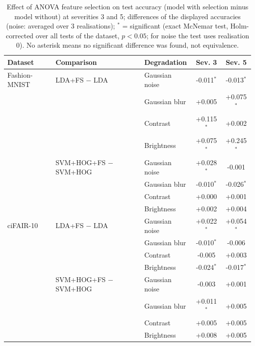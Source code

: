 \begin{table}[t]
\centering
\caption{Effect of ANOVA feature selection on test accuracy (model with selection minus model without) at severities 3 and 5; differences of the displayed accuracies (noise: averaged over 3 realisations); $^{*}$ = significant (exact McNemar test, Holm-corrected over all tests of the dataset, $p<0.05$; for noise the test uses realisation 0). No asterisk means no significant difference was found, not equivalence.}
\label{tab:fs}
\small
\begin{tabular}{lllcc}
\toprule
Dataset & Comparison & Degradation & Sev. 3 & Sev. 5 \\
\midrule
Fashion-MNIST & LDA+FS $-$ LDA & Gaussian noise & -0.011$^{*}$ & -0.013$^{*}$ \\
 &  & Gaussian blur & +0.005 & +0.075$^{*}$ \\
 &  & Contrast & +0.115$^{*}$ & +0.002 \\
 &  & Brightness & +0.075$^{*}$ & +0.245$^{*}$ \\
 & SVM+HOG+FS $-$ SVM+HOG & Gaussian noise & +0.028$^{*}$ & -0.001 \\
 &  & Gaussian blur & -0.010$^{*}$ & -0.026$^{*}$ \\
 &  & Contrast & +0.000 & +0.001 \\
 &  & Brightness & +0.002 & +0.004 \\
\midrule
ciFAIR-10 & LDA+FS $-$ LDA & Gaussian noise & +0.022$^{*}$ & +0.054$^{*}$ \\
 &  & Gaussian blur & -0.010$^{*}$ & -0.006 \\
 &  & Contrast & -0.005 & +0.003 \\
 &  & Brightness & -0.024$^{*}$ & -0.017$^{*}$ \\
 & SVM+HOG+FS $-$ SVM+HOG & Gaussian noise & -0.003 & +0.001 \\
 &  & Gaussian blur & +0.011$^{*}$ & +0.005 \\
 &  & Contrast & +0.005 & +0.005 \\
 &  & Brightness & +0.008 & +0.005 \\
\bottomrule
\end{tabular}
\end{table}
